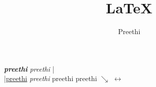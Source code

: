 \documentclass[a4paper,10pt]{article}
\title{\LaTeX}
\author{Preethi}
\begin{document}
\maketitle %
\newpage
\textbf{\textit{preethi}}
\newline
\textsl{preethi}
|\\|\underline{preethi}
\emph{preethi}
\tiny{preethi}
\Huge{preethi}
\Huge$\searrow$
\small$\leftrightarrow$
\end{document}
